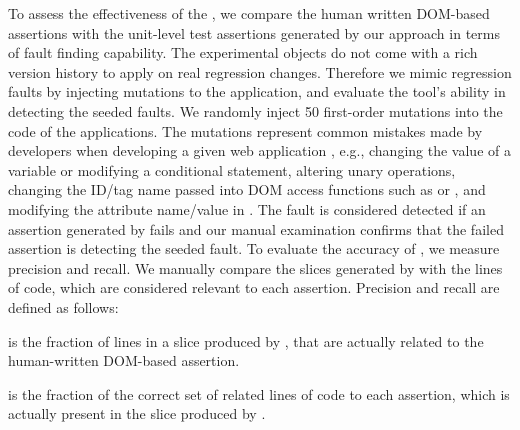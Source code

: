  To assess the effectiveness of the \tool, we compare the human written DOM-based assertions with the unit-level test assertions generated by our approach in terms of fault finding capability.
The experimental objects do not come with a rich version history to apply \tool on real regression changes. Therefore we mimic regression faults by injecting mutations to the application, and evaluate the tool's ability in detecting the seeded faults. We randomly inject 50 first-order mutations into the \javascript code of the applications. The mutations represent common mistakes made by developers when developing a given web application \cite{mirshokraie:icst13}, e.g., changing the value of a variable or modifying a conditional statement, altering unary operations, changing the ID/tag name passed into DOM access functions such as  or , and modifying the attribute name/value in . The fault is considered detected if an assertion generated by \tool fails and our manual examination confirms that the failed assertion is detecting the seeded fault.
 To evaluate the accuracy of \tool, we measure precision and recall. We manually compare the slices generated by \tool with the \javascript lines of code, which are considered relevant to each assertion. Precision and recall are defined as follows:
\begin{description}[noitemsep, nolistsep, font=\normalfont\itshape]
\item [Precision] is the fraction of lines in a slice produced by \tool, that are actually related to the human-written DOM-based assertion. 
\item [Recall] is the fraction of the correct set of related lines of code to each assertion, which is actually present in the slice produced by \tool.
\end{description}

